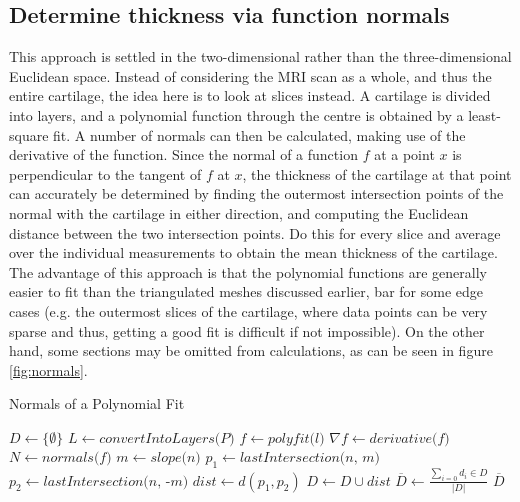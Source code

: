 \subsection{Determine thickness via function normals}
\label{sec:Normals}
This approach is settled in the two-dimensional rather than the three-dimensional Euclidean space. Instead of considering the MRI scan as a whole, and thus the entire cartilage, the idea here is to look at slices instead. A cartilage is divided into layers, and a polynomial function through the centre is obtained by a least-square fit. A number of normals can then be calculated, making use of the derivative of the function. Since the normal of a function $f$ at a point $x$ is perpendicular to the tangent of $f$ at $x$, the thickness of the cartilage at that point can accurately be determined by finding the outermost intersection points of the normal with the cartilage in either direction, and computing the Euclidean distance between the two intersection points. Do this for every slice and average over the individual measurements to obtain the mean thickness of the cartilage. The advantage of this approach is that the polynomial functions are generally easier to fit than the triangulated meshes discussed earlier, bar for some edge cases (e.g. the outermost slices of the cartilage, where data points can be very sparse and thus, getting a good fit is difficult if not impossible). On the other hand, some sections may be omitted from calculations, as can be seen in figure \ref{fig:normals}.
\begin{algorithm}
	\caption{Normals of a Polynomial Fit}
	\label{algo:normals}
	\begin{algorithmic}[1]
		\State $D \gets \{\emptyset\}$
		\State $L \gets \textit{convertIntoLayers(P)}$
			\State $f \gets \textit{polyfit(l)}$
			\State $\nabla f \gets \textit{derivative(f)}$
			\State $N \gets \textit{normals(f)}$
				\State $m \gets \textit{slope(n)}$
				\State $p_1 \gets \textit{lastIntersection(n, m)}$
				\State $p_2 \gets \textit{lastIntersection(n, -m)}$
				\State $dist \gets d(p_1, p_2)$
				\State $D \gets D \cup dist$
				\State
			\EndFor
		\EndFor
		\State $\overline{D} \gets \frac{\sum_{i = 0} d_{i} \in D}{\lvert D \rvert}$
		\State
		\Return $\overline{D}$
		\EndProcedure
	\end{algorithmic}
\end{algorithm}
